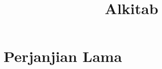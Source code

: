 \documentclass[twoside,twocolumn,letterpaper,11pt]{book}
\title{Alkitab}
\date{}
\author{}
\begin{document}
\maketitle
\tableofcontents

\part*{Perjanjian Lama}
  \setlength{\columnseprule}{.5pt}


\end{document}
